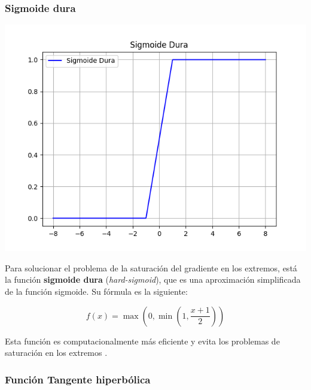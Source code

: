 \subsubsection*{Sigmoide dura}


\begin{minipage}{0.35\textwidth}
    \includegraphics[width=1.1\textwidth]{img/Sigmoide Dura.png}
    \label{img: sigmoideDura}
\end{minipage}
\begin{minipage}{0.05\textwidth}
\textbf{ }
\end{minipage}
\begin{minipage}{0.6\textwidth}
    Para solucionar el problema de la saturación del gradiente en los extremos, está la función \textbf{sigmoide dura} (\textit{hard-sigmoid}), que es una aproximación simplificada de la función sigmoide. Su fórmula es la siguiente:

\begin{equation}
    f(x) = \max(0, \min(1, \frac{x+1}{2}))
\end{equation}

Esta función es computacionalmente más eficiente y evita los problemas de saturación en los extremos \citep{pajares2021aprendizaje}.
\end{minipage}



\subsubsection*{Función Tangente hiperbólica}
 

